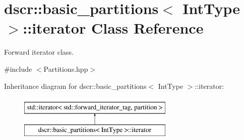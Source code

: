 \hypertarget{classdscr_1_1basic__partitions_1_1iterator}{\section{dscr\-:\-:basic\-\_\-partitions$<$ Int\-Type $>$\-:\-:iterator Class Reference}
\label{classdscr_1_1basic__partitions_1_1iterator}
}


Forward iterator class.  




{\ttfamily \#include $<$Partitions.\-hpp$>$}

Inheritance diagram for dscr\-:\-:basic\-\_\-partitions$<$ Int\-Type $>$\-:\-:iterator\-:\begin{figure}[H]
\begin{center}
\leavevmode
\includegraphics[height=2.000000cm]{classdscr_1_1basic__partitions_1_1iterator}
\end{center}
\end{figure}
